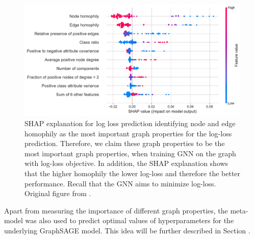 \begin{figure}
	\includegraphics[width=\linewidth]{images/graph-property-importance.pdf}
	\caption{SHAP explanation for log loss prediction identifying node and edge homophily as the most important graph properties for the log-loss prediction. Therefore, we claim these graph properties to be the most important graph properties, when training GNN on the graph with log-loss objective. In addition, the SHAP explanation shows that the higher homophily the lower log-loss and therefore the better performance. Recall that the GNN aims to minimize log-loss. Original figure from \cite{prochazka_which_2023}.}
	\label{fig:graph-property-importance}
\end{figure}

Apart from measuring the importance of different graph properties, the meta-model was also used to predict optimal values of hyperparameters for the underlying GraphSAGE model. This idea will be further described in Section .
